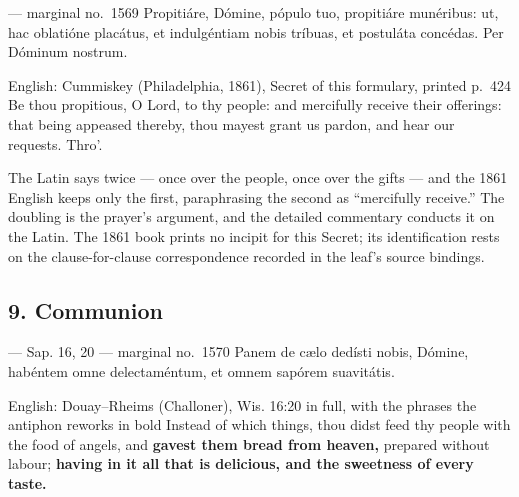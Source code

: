 \begin{appointedlatin}{ --- marginal no.\ 1569}
Propitiáre, Dómine, pópulo tuo, propitiáre munéribus: ut, hac oblatióne
placátus, et indulgéntiam nobis tríbuas, et postuláta concédas. Per Dóminum
nostrum.
\end{appointedlatin}

\begin{namedtranslation}{English: Cummiskey (Philadelphia, 1861), Secret of this formulary, printed p.~424}
Be thou propitious, O Lord, to thy people: and mercifully receive their
offerings: that being appeased thereby, thou mayest grant us pardon, and hear
our requests. Thro'.
\end{namedtranslation}

The Latin says  twice --- once over the people, once over the
gifts --- and the 1861 English keeps only the first, paraphrasing the second as
``mercifully receive.'' The doubling is the prayer's argument, and the
detailed commentary conducts it on the Latin. The 1861 book prints no incipit
for this Secret; its identification rests on the clause-for-clause
correspondence recorded in the leaf's source bindings.


\elementguard
\subsection*{9. Communion }

\begin{appointedlatin}{ --- Sap. 16, 20 --- marginal no.\ 1570}
Panem de cælo dedísti nobis, Dómine, habéntem omne delectaméntum, et omnem
sapórem suavitátis.
\end{appointedlatin}

\begin{namedtranslation}{English: Douay--Rheims (Challoner), Wis. 16:20 in full, with the phrases the antiphon reworks in bold}
Instead of which things, thou didst feed thy people with the food of angels,
and \textbf{gavest them bread from heaven,} prepared without labour;
\textbf{having in it all that is delicious, and the sweetness of every taste.}
\end{namedtranslation}

